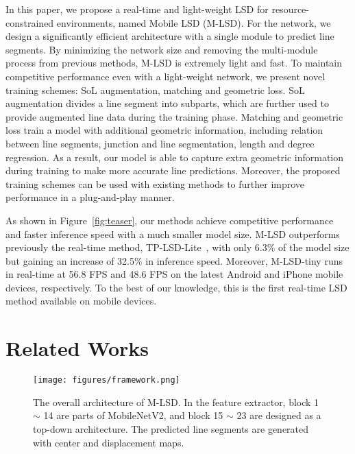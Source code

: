 \documentclass[letterpaper]{article} \usepackage{aaai22}  \usepackage{times}  \usepackage{helvet}  \usepackage{courier}  \usepackage[hyphens]{url}  \usepackage{graphicx} \urlstyle{rm} \def\UrlFont{\rm}  \usepackage{natbib}  \usepackage{caption} \DeclareCaptionStyle{ruled}{labelfont=normalfont,labelsep=colon,strut=off} \frenchspacing  \setlength{\pdfpagewidth}{8.5in}  \setlength{\pdfpageheight}{11in}  \usepackage{algorithm}
\begin{document}
In this paper, we propose a real-time and light-weight LSD for resource-constrained environments, named Mobile LSD (M-LSD).
For the network, we design a significantly efficient architecture with a single module to predict line segments.
By minimizing the network size and removing the multi-module process from previous methods, M-LSD is extremely light and fast.
To maintain competitive performance even with a light-weight network, we present novel training schemes: SoL augmentation, matching and geometric loss.
SoL augmentation divides a line segment into subparts, which are further used to provide augmented line data during the training phase.
Matching and geometric loss train a model with additional geometric information, including relation between line segments, junction and line segmentation, length and degree regression.
As a result, our model is able to capture extra geometric information during training to make more accurate line predictions.
Moreover, the proposed training schemes can be used with existing methods to further improve performance in a plug-and-play manner.

As shown in Figure~\ref{fig:teaser}, our methods achieve competitive performance and faster inference speed with a much smaller model size.
M-LSD outperforms previously the real-time method, TP-LSD-Lite~\cite{huang2020tp}, with only 6.3\% of the model size but gaining an increase of 32.5\% in inference speed.
Moreover, M-LSD-tiny runs in real-time at 56.8 FPS and 48.6 FPS on the latest Android and iPhone mobile devices, respectively.
To the best of our knowledge, this is the first real-time LSD method available on mobile devices.

\section{Related Works}

\begin{comment}
\begin{figure}[t!]
\centering
\texttt{[image: figures/framework\_vertical.png]}
\caption{An overview of M-LSD network architecture. The final feature maps are extracted from the feature extractor, which consists of TP, SoL, and segmentation maps. The predicted line segments are generated by merging center points and displacement vectors from the TP maps.}
\label{fig:framework}
\end{figure}
\end{comment}

\begin{figure*}[t!]
\centering
\texttt{[image: figures/framework.png]}
\caption{The overall architecture of M-LSD. In the feature extractor, block 1 $\sim$ 14 are parts of MobileNetV2, and block 15 $\sim$ 23 are designed as a top-down architecture. The predicted line segments are generated with center and displacement maps.}
\label{fig:framework}
\end{figure*}
\end{document}
